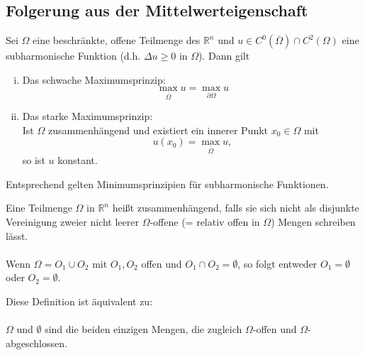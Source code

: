 \subsection{Folgerung aus der Mittelwerteigenschaft} 
\label{sub:folgerung_aus_der_mittelwerteigenschaft}
\begin{satz}[Maximumsprinzipien]
	Sei $\Omega$ eine beschränkte, offene Teilmenge des $\mathbb{R}^n$ und $u \in C^0(\overline{\Omega}) \cap C^2(\Omega)$ eine subharmonische Funktion (d.h. $ \Delta u \geq 0$ in $\Omega$). Dann gilt
	\begin{enumerate}[(i)]
		\item Das schwache Maximumsprinzip:
		\[
			\max_{\overline{\Omega}} u = \max_{\partial \Omega}u
		\]
		\item Das starke Maximumsprinzip: \\
		Ist $\Omega$ zusammenhängend und existiert ein innerer Punkt $x_0 \in \Omega$ mit \[
			u(x_0) = \max_{ \overline{\Omega}} u,
		\]so ist $u$ konstant.
	\end{enumerate}
\end{satz}
\begin{bemerkung}
	Entsprechend gelten Minimumsprinzipien für subharmonische Funktionen.
\end{bemerkung}
\begin{definition*}
	Eine Teilmenge $\Omega$ in $\mathbb{R}^n$ heißt zusammenhängend,
	falls sie sich nicht als disjunkte Vereinigung zweier nicht leerer $\Omega$-offene (= relativ offen in $\Omega$) Mengen schreiben lässt. \\
	\\
	Wenn $\Omega = O_1 \cup O_2$ mit $O_1,O_2$ offen und $O_1 \cap O_2 = \emptyset$, so folgt entweder $O_1 = \emptyset$ oder $O_2 = \emptyset$.
\end{definition*}
\begin{bemerkung}
	Diese Definition ist äquivalent zu: \\
	\\
	$\Omega$ und $\emptyset$ sind die beiden einzigen Mengen, die zugleich $\Omega$-offen und $\Omega$-abgeschlossen.
\end{bemerkung}

